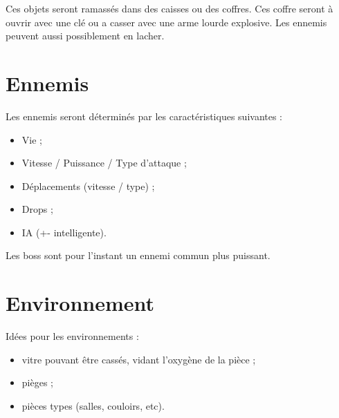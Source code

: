 \documentclass[a4paper,12pt]{article}
\begin{document}
Ces objets seront ramassés dans des caisses ou des coffres. Ces coffre seront à ouvrir avec une clé
ou a casser avec une arme lourde explosive. Les ennemis peuvent aussi possiblement en lacher.

\section{Ennemis}
Les ennemis seront déterminés par les caractéristiques suivantes :
\begin{itemize}
  \item Vie ;
  \item Vitesse / Puissance / Type d'attaque ;
  \item Déplacements (vitesse / type) ;
  \item Drops ;
  \item IA (+- intelligente).
\end{itemize}

Les boss sont pour l'instant un ennemi commun plus puissant.

\section{Environnement}
Idées pour les environnements :
\begin{itemize}
  \item vitre pouvant être cassés, vidant l'oxygène de la pièce ;
  \item pièges ;
  \item pièces types (salles, couloirs, etc).
\end{itemize}
\end{document}
